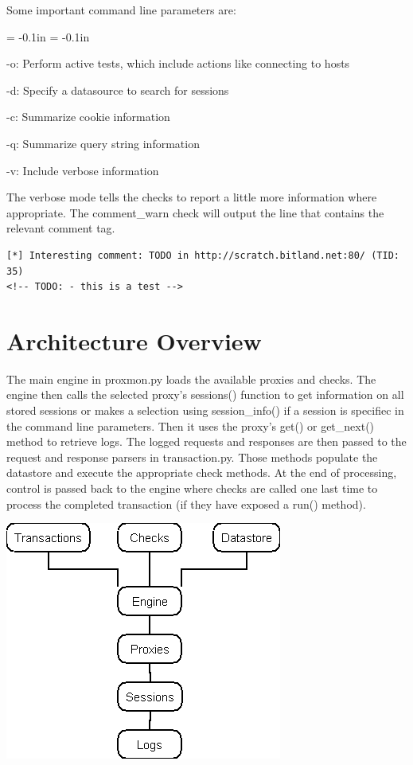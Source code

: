 \documentclass{article}
\newenvironment{mindesc}{\begin{description}\parsep = -0.1in \itemsep = -0.1in}{\end{description}}
\begin{document}
Some important command line parameters are:
\begin{mindesc}
\item[-o:] Perform active tests, which include actions like connecting to hosts
\item[-d:] Specify a datasource to search for sessions
\item[-c:] Summarize cookie information
\item[-q:] Summarize query string information
\item[-v:] Include verbose information
\end{mindesc}

The verbose mode tells the checks to report a little more information where appropriate.
The comment\_warn check will output the line that contains the relevant comment tag.
\begin{lstlisting}[style=output]
[*] Interesting comment: TODO in http://scratch.bitland.net:80/ (TID: 35)
<!-- TODO: - this is a test -->
\end{lstlisting}

\section{Architecture Overview}
The main engine in proxmon.py loads the available proxies and checks.  The engine
then calls the selected proxy's sessions() function to get 
information on all stored sessions or makes a selection using session\_info() if a
session is specifiec in the command line parameters.  Then it uses the proxy's 
get() or get\_next() method to retrieve logs.
The logged requests and responses are then passed to the request and response parsers in 
transaction.py.  
Those methods populate the datastore and execute the appropriate check methods.
At the end of processing, control is passed back to the engine where checks are called
one last time to process the completed transaction (if they have exposed a run() method).

\includegraphics[scale=0.45]{arch.png}
\end{document}

